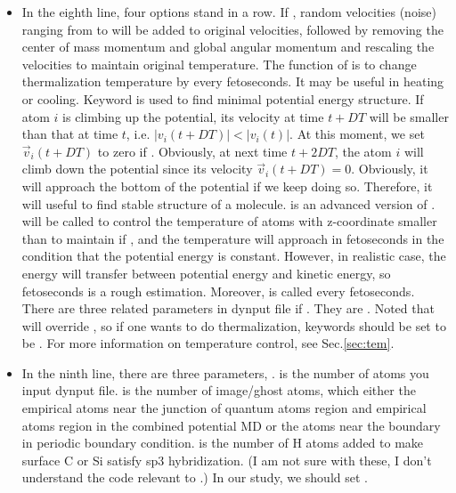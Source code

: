 \documentclass[11pt]{JHEP3}
\begin{document}
\begin{itemize}
\item In the eighth line, four options
 stand in a row. If
, random velocities (noise) ranging from
 to  will be added to original
velocities, followed by removing the center of mass momentum and
global angular momentum and rescaling the velocities to maintain
original temperature. The function of  is to change
thermalization temperature  by  every
 fetoseconds. It may be useful in heating or cooling.
Keyword  is used to find minimal potential energy
structure. If atom $i$ is climbing up the potential, its velocity at
time $t+DT$ will be smaller than that at time $t$, i.e.
$|v_i(t+DT)|<|v_i(t)|$. At this moment, we set $\vec{v}_i(t+DT)$ to
zero if . Obviously, at next time $t+2DT$, the atom
$i$ will climb down the potential since its velocity
$\vec{v}_i(t+DT)=0$. Obviously, it will approach the bottom of the
potential if we keep doing so. Therefore, it will useful to find
stable structure of a molecule.  is an advanced
version of .  will be
called to control the temperature of atoms with z-coordinate smaller
than  to maintain  if ,
and the temperature will approach  in 
fetoseconds in the condition that the potential energy is constant.
However, in realistic case, the energy will transfer between
potential energy and kinetic energy, so 
fetoseconds is a rough estimation. Moreover,  is called every  fetoseconds. There are three
related parameters in dynput file if . They are
. Noted that  will override
, so if one wants to do thermalization, keywords
should be set to be . For more
information on temperature control, see Sec.\ref{sec:tem}.

\item In the ninth line, there are three parameters, .  is the number of atoms you input dynput file.
 is the number of image/ghost atoms, which either the
empirical atoms near the junction of quantum atoms region and
empirical atoms region in the combined potential MD or the atoms
near the boundary in periodic boundary condition.  is
the number of H atoms added to make surface C or Si satisfy sp3
hybridization. (I am not sure with these, I don't understand the
code relevant to .) In our study, we should set
.


\end{itemize}
\end{document}
